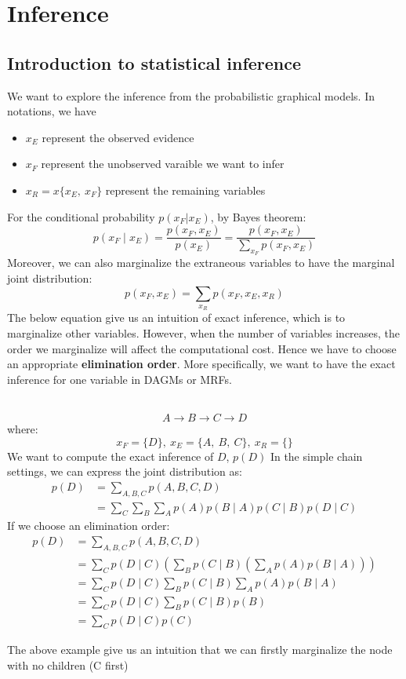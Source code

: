 \section{Inference}
\subsection{Introduction to statistical inference}
We want to explore the inference from the probabilistic graphical models. In notations, we have
\begin{itemize}
    \item $x_E$ represent the observed evidence
    \item $x_F$ represent the unobserved varaible we want to infer
    \item $x_R=x\{x_E,\:x_F\}$ represent the remaining variables
\end{itemize} 
For the conditional probability $p(x_F|x_E)$, by Bayes theorem:
$$p\left(x_F \mid x_E\right)=\frac{p\left(x_F, x_E\right)}{p\left(x_E\right)}=\frac{p\left(x_F, x_E\right)}{\sum_{x_F} p\left(x_F, x_E\right)}$$
Moreover, we can also marginalize the extraneous variables to have the marginal joint distribution:
$$p\left(x_F, x_E\right)=\sum_{x_R} p\left(x_F, x_E, x_R\right)$$
The below equation give us an intuition of exact inference, which is to marginalize other variables. However, when the number of variables increases, the order we marginalize will affect the computational cost. Hence we have to choose an appropriate \textbf{elimination order}. More specifically, we want to have the exact inference for one variable in DAGMs or MRFs.
\begin{example}
    \\
    $$A \rightarrow B \rightarrow C \rightarrow D$$
    where:
    $$x_F=\{D\},\:x_E=\{A,\:B,\:C\},\:x_R=\{\}$$
    We want to compute the exact inference of $D$, $p(D)$
    In the simple chain settings, we can express the joint distribution as:
    \begin{align*}
        p(D)&=\sum_{A,B,C}p(A,B,C,D)\\
        &=\sum_C \sum_B \sum_A p(A) p(B \mid A) p(C \mid B) p(D \mid C)
    \end{align*}
    If we choose an elimination order:
    \begin{align*}
        p(D)&=\sum_{A,B,C}p(A,B,C,D)\\
        &=\sum_C p(D \mid C)\left(\sum_B p(C \mid B)\left(\sum_A p(A) p(B \mid A)\right)\right)\\
        &=\sum_C p(D \mid C) \sum_B p(C \mid B) \sum_A p(A) p(B \mid A) \\
        & =\sum_C p(D \mid C) \sum_B p(C \mid B) p(B) \\
        & =\sum_C p(D \mid C) p(C)
    \end{align*}
    \end{example}
The above example give us an intuition that we can firstly marginalize the node with no children (C first)